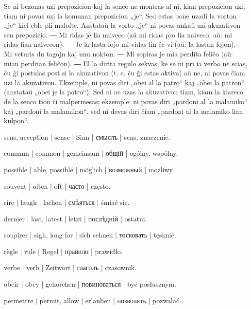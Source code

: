 Se ni bezonas uzi prepozicion kaj la senco ne montras al ni, kian prepozicion uzi, tiam ni povas uzi la komunan prepozicion „je“. Sed estas bone uzadi la vorton „je“ kiel eble pli malofte. Anstataŭ la vorto „je“ ni povas ankaŭ uzi akuzativon sen prepozicio. ― Mi ridas je lia naiveco (aŭ mi ridas pro lia naiveco, aŭ: mi ridas lian naivecon). ― Je la lasta fojo mi vidas lin ĉe vi (aŭ: la lastan fojon). ― Mi veturis du tagojn kaj unu nokton. ― Mi sopiras je mia perdita feliĉo (aŭ: mian perditan feliĉon). ― El la dirita regulo sekvas, ke se ni pri ia verbo ne scias, ĉu ĝi postulas post si la akuzativon (t. e. ĉu ĝi estas aktiva) aŭ ne, ni povas ĉiam uzi la akuzativon. Ekzemple, ni povas diri „obei al la patro“ kaj „obei la patron“ (anstataŭ „obei je la patro“). Sed ni ne uzas la akuzativon tiam, kiam la klareco de la senco tion ĉi malpermesas; ekzemple: ni povas diri „pardoni al la malamiko“ kaj „pardoni la malamikon“, sed ni devas diri ĉiam „pardoni al la malamiko lian kulpon“.

\begin{ekzvocab}{1em}
 sens, acception | sense | Sinn | смыслъ | sens, znaczenie.

 commun | common | gemeinsam | общій | ogólny, wspólny.

 possible | able, possible | möglich | возможный | możliwy.

 souvent | often | oft | часто | często.

 rire | laugh | lachen | смѣяться | śmiać się.

 dernier | last, latest | letzt | послѣдній | ostatni.

 soupirer | sigh, long for | sich sehnen | тосковать | tęsknić.

 règle | rule | Regel | правило | prawidło.

 verbe | verb | Zeitwort | глаголъ | czasownik.

 obéir | obey | gehorchen | повиноваться | być posłusznym.

 permettre | permit, allow | erlauben | позволять | pozwalać.

\end{ekzvocab}



